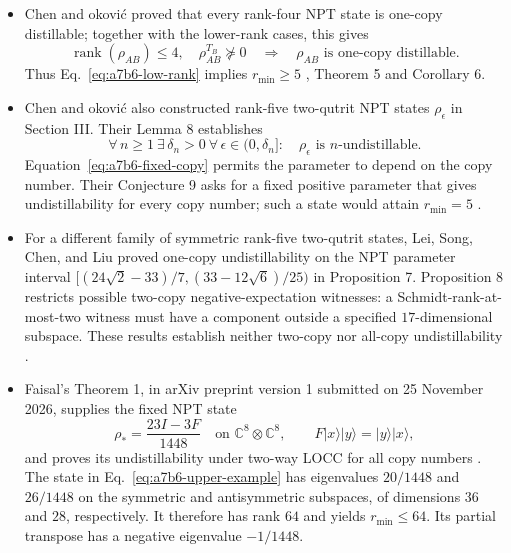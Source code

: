\begin{itemize}
  \item Chen and \DJ okovi\'c proved that every rank-four NPT state is
one-copy distillable; together with the lower-rank cases, this gives
\begin{equation}
  \operatorname{rank}(\rho_{AB})\leq4,\quad
  \rho_{AB}^{T_B}\not\succeq0
  \quad\Longrightarrow\quad
  \rho_{AB}\text{ is one-copy distillable}.
  \label{eq:a7b6-low-rank}
\end{equation}
Thus Eq.~\eqref{eq:a7b6-low-rank} implies $r_{\min}\geq5$
, Theorem 5 and Corollary 6.

  \item Chen and \DJ okovi\'c also constructed rank-five two-qutrit NPT
states $\rho_\epsilon$ in Section III. Their Lemma 8 establishes
\begin{equation}
  \forall\,n\geq1\ \exists\,\delta_n>0\ \forall\,\epsilon\in(0,\delta_n]:
  \quad\rho_\epsilon\text{ is }n\text{-undistillable}.
  \label{eq:a7b6-fixed-copy}
\end{equation}
Equation~\eqref{eq:a7b6-fixed-copy} permits the parameter to depend on
the copy number. Their Conjecture 9 asks for a fixed positive parameter
that gives undistillability for every copy number; such a state would
attain $r_{\min}=5$
.

  \item For a different family of symmetric rank-five two-qutrit states,
Lei, Song, Chen, and Liu proved one-copy undistillability on the NPT
parameter interval $[(24\sqrt2-33)/7,(33-12\sqrt6)/25)$ in Proposition 7.
Proposition 8 restricts possible two-copy negative-expectation witnesses:
a Schmidt-rank-at-most-two witness must have a component outside a
specified $17$-dimensional subspace. These results establish neither
two-copy nor all-copy undistillability
.

  \item Faisal's Theorem 1, in arXiv preprint version 1 submitted on
25 November 2026, supplies the fixed NPT state
\begin{equation}
  \rho_* = \frac{23I-3F}{1448}
  \quad\text{on }\mathbb C^8\otimes\mathbb C^8,
  \qquad F\lvert x\rangle\lvert y\rangle=\lvert y\rangle\lvert x\rangle,
  \label{eq:a7b6-upper-example}
\end{equation}
and proves its undistillability under two-way LOCC for all copy numbers
.
The state in Eq.~\eqref{eq:a7b6-upper-example} has eigenvalues $20/1448$
and $26/1448$ on the symmetric and antisymmetric subspaces, of dimensions
$36$ and $28$, respectively. It therefore has rank $64$ and yields
$r_{\min}\leq64$. Its partial transpose has a negative eigenvalue
$-1/1448$.
\end{itemize}


